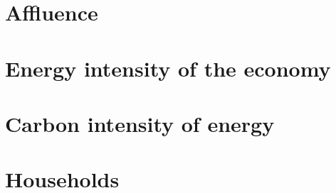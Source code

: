 \documentclass{book}\usepackage[]{graphicx}\usepackage[]{color}
\begin{document}
\chapter{Affluence}
\label{chap:affluence}





\cleardoublepage
    

\chapter{Energy intensity of the economy}
\label{chap:energy_intensity}





\cleardoublepage
    

\chapter{Carbon intensity of energy}
\label{chap:carbon_intensity}





\cleardoublepage
    

\chapter{Households}
\label{chap:households}





\cleardoublepage
    
\end{document}
